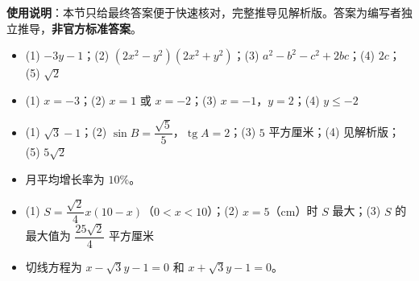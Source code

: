 
\begin{gknotice}
\textbf{使用说明}：本节只给最终答案便于快速核对，完整推导见解析版。答案为编写者独立推导，\textbf{非官方标准答案}。
\end{gknotice}

\begin{itemize}[leftmargin=2.6em]
  \item[\textbf{1.}] (1) $-3y-1$；(2) $(2x^2-y^2)(2x^2+y^2)$；(3) $a^2-b^2-c^2+2bc$；(4) $2c$；(5) $\sqrt2$
  \item[\textbf{2.}] (1) $x=-3$；(2) $x=1$ 或 $x=-2$；(3) $x=-1$，$y=2$；(4) $y\leqslant-2$
  \item[\textbf{3.}] (1) $\sqrt3-1$；(2) $\sin B=\dfrac{\sqrt5}{5}$，$\operatorname{tg}A=2$；(3) $5$ 平方厘米；(4) 见解析版；(5) $5\sqrt2$
  \item[\textbf{4.}] 月平均增长率为 $10\%$。
  \item[\textbf{5.}] (1) $S=\dfrac{\sqrt2}{4}x(10-x)$（$0<x<10$）；(2) $x=5$（$\mathrm{cm}$）时 $S$ 最大；(3) $S$ 的最大值为 $\dfrac{25\sqrt2}{4}$ 平方厘米
  \item[\textbf{6.}] 切线方程为 $x-\sqrt3y-1=0$ 和 $x+\sqrt3y-1=0$。
\end{itemize}
